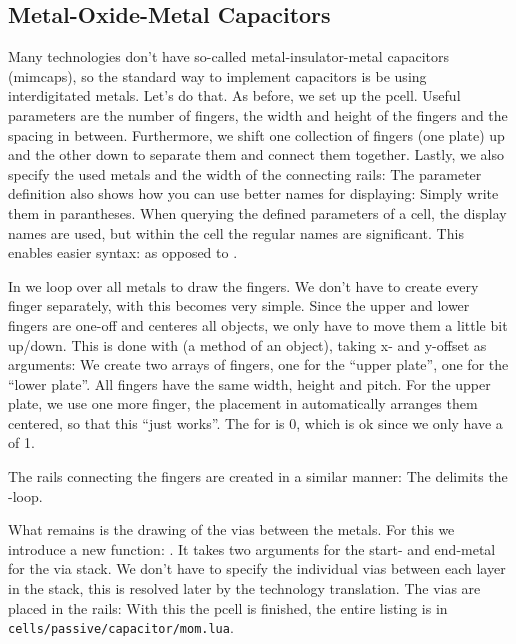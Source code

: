 \subsection{Metal-Oxide-Metal Capacitors}
Many technologies don't have so-called metal-insulator-metal capacitors (mimcaps), so the standard way to implement capacitors is be using interdigitated metals.
Let's do that. As before, we set up the pcell. Useful parameters are the number of fingers, the width and height of the fingers and the spacing in between.
Furthermore, we shift one collection of fingers (one plate) up and the other down to separate them and connect them together. Lastly, we also specify the used
metals and the width of the connecting rails:
The parameter definition also shows how you can use better names for displaying: Simply write them in parantheses. When querying the defined parameters of a
cell, the display names are used, but within the cell the regular names are significant. This enables easier syntax:  as opposed to
.

In  we  loop over all metals to draw the fingers. We don't have to create every finger separately, with  this
becomes very simple. Since the upper and lower fingers are one-off and  centeres all objects, we only have to move them a little bit
up/down. This is done with  (a method of an object), taking x- and y-offset as arguments: 
We create two arrays of fingers, one for the \enquote{upper plate}, one for the \enquote{lower plate}. All fingers have the same width, height and pitch. For the
upper plate, we use one more finger, the placement in  automatically arranges them centered, so that this \enquote{just works}.  The
 for  is \num{0}, which is ok since we only have a  of \num{1}. 

The rails connecting the fingers are created in a similar manner:
The  delimits the -loop.

What remains is the drawing of the vias between the metals. For this we introduce a new  function: . It takes two
arguments for the start- and end-metal for the via stack. We don't have to specify the individual vias between each layer in the stack, this is resolved later by the
technology translation. The vias are placed in the rails:
With this the pcell is finished, the entire listing is in \texttt{cells/passive/capacitor/mom.lua}.

